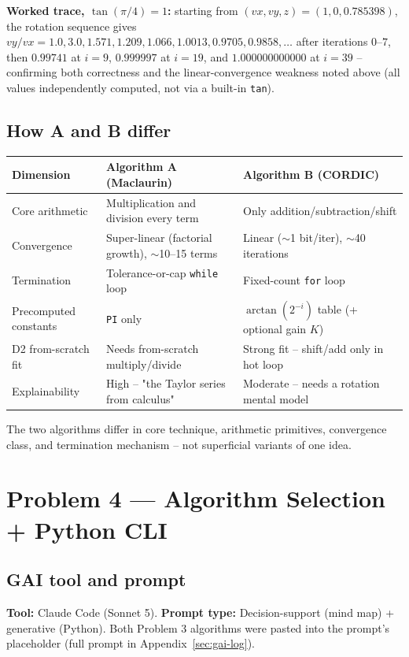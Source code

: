 \documentclass[11pt]{article}
\begin{document}
\textbf{Worked trace, $\tan(\pi/4)=1$:} starting from $(vx,vy,z)=(1,0,0.785398)$, the rotation sequence gives $vy/vx = 1.0, 3.0, 1.571, 1.209, 1.066, 1.0013, 0.9705, 0.9858, \ldots$ after iterations $0$--$7$, then $0.99741$ at $i{=}9$, $0.999997$ at $i{=}19$, and $1.000000000000$ at $i{=}39$ -- confirming both correctness and the linear-convergence weakness noted above (all values independently computed, not via a built-in \texttt{tan}).

\subsection{How A and B differ}

\begin{longtable}{L{3.2cm}L{5.6cm}L{5.6cm}}
\toprule
\textbf{Dimension} & \textbf{Algorithm A (Maclaurin)} & \textbf{Algorithm B (CORDIC)} \\
\midrule
\endhead
Core arithmetic & Multiplication and division every term & Only addition/subtraction/shift \\
Convergence & Super-linear (factorial growth), $\sim$10--15 terms & Linear ($\sim$1 bit/iter), $\sim$40 iterations \\
Termination & Tolerance-or-cap \texttt{while} loop & Fixed-count \texttt{for} loop \\
Precomputed constants & \texttt{PI} only & $\arctan(2^{-i})$ table (+ optional gain $K$) \\
D2 from-scratch fit & Needs from-scratch multiply/divide & Strong fit -- shift/add only in hot loop \\
Explainability & High -- "the Taylor series from calculus" & Moderate -- needs a rotation mental model \\
\bottomrule
\end{longtable}

The two algorithms differ in core technique, arithmetic primitives, convergence class, and termination mechanism -- not superficial variants of one idea.

\section{Problem 4 --- Algorithm Selection + Python CLI}

\subsection{GAI tool and prompt}
\textbf{Tool:} Claude Code (Sonnet 5). \textbf{Prompt type:} Decision-support (mind map) + generative (Python). Both Problem 3 algorithms were pasted into the prompt's placeholder (full prompt in Appendix~\ref{sec:gai-log}).
\end{document}
